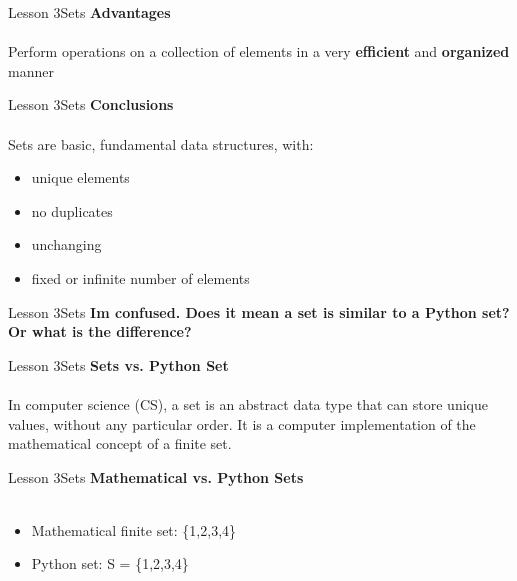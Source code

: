 \documentclass[aspectratio=1610]{beamer}
\begin{document}
\begin{frame}{Lesson 3}{Sets}
\LARGE
\textbf{Advantages}\\~\\
Perform operations on a collection of elements in a very \textbf{efficient} and \textbf{organized} manner
\end{frame}


\begin{frame}{Lesson 3}{Sets}
\LARGE
\textbf{Conclusions}\\~\\
Sets are basic, fundamental data structures, with:
\begin{itemize}
    \item unique elements
    \item no duplicates
    \item unchanging 
    \item fixed or infinite number of elements
\end{itemize}

\end{frame}


\begin{frame}{Lesson 3}{Sets}
\LARGE
\textbf{Im confused. Does it mean a set is similar to a Python set? Or what is the difference?}
\end{frame}


\begin{frame}{Lesson 3}{Sets}
\LARGE
\textbf{Sets vs. Python Set}\\~\\
In computer science (CS), a set is an abstract data type that can store unique values, without any particular order. It is a computer implementation of the mathematical concept of a finite set.
\end{frame}



\begin{frame}{Lesson 3}{Sets}
\LARGE
\textbf{Mathematical vs. Python Sets}\\~\\
\begin{itemize}
    \item Mathematical finite set: \{1,2,3,4\}
    \item Python set: S = \{1,2,3,4\}
\end{itemize}
\end{frame}



\end{document}
